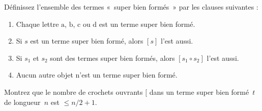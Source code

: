 \documentclass[../../../include/open-logic-section]{subfiles}
\begin{document}
\begin{prob}
  Définissez l'ensemble
  des termes
  «~super bien formés~»
  par les clauses
  suivantes :
  \begin{enumerate}
  \item Chaque lettre
    $\mathrm{a}$, $\mathrm{b}$,
    $\mathrm{c}$ ou $\mathrm{d}$
    est un terme
    super bien formé.
  \item Si $s$ est
    un terme super
    bien formé,
    alors $[s]$
    l'est aussi.
  \item Si $s_1$
    et $s_2$
    sont des termes
    super bien formés,
    alors
    $[s_1 \circ s_2]$
    l'est aussi.
  \item Aucun autre
    objet n'est un
    terme super
    bien formé.
  \end{enumerate}
  Montrez que le
  nombre de crochets
  ouvrants $[$
  dans un terme
  super bien formé~$t$
  de longueur~$n$
  est $\le n/2+1$.
\end{prob}
\end{document}
